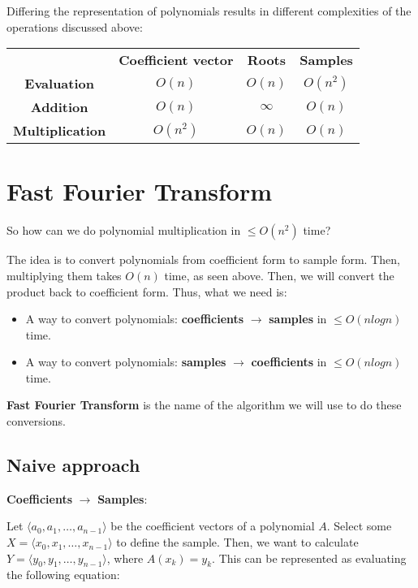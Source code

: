 \documentclass[11pt]{article}
\theoremstyle{plain}
\theoremstyle{definition}
\begin{document}
Differing the representation of polynomials results in different complexities of the operations 
discussed above:

\begin{center}
    \begin{tabular}{ c c c c }
        & \textbf{Coefficient vector} & \textbf{Roots} & \textbf{Samples} \\ 
        \textbf{Evaluation} & $O(n)$ & $O(n)$ & $O(n^2)$\\
        \textbf{Addition} & $O(n)$ & $\infty$ & $O(n)$\\
        \textbf{Multiplication} & $O(n^2)$ & $O(n)$ & $O(n)$\\
    \end{tabular}
\end{center}

\section{Fast Fourier Transform}

So how can we do polynomial multiplication in $\leq O(n^2)$ time?

The idea is to convert polynomials from coefficient form to sample form. Then, multiplying them takes 
$O(n)$ time, as seen above. Then, we will convert the product back to coefficient form. Thus, what
we need is:
\begin{itemize}
    \item A way to convert polynomials: \textbf{coefficients} $\rightarrow$ \textbf{samples} in 
        $\leq O(nlogn)$ time.
    \item A way to convert polynomials: \textbf{samples} $\rightarrow$ \textbf{coefficients} in 
        $\leq O(nlogn)$ time.
\end{itemize}

\textbf{Fast Fourier Transform} is the name of the algorithm we will use to do these conversions.

\subsection{Naive approach}

\textbf{Coefficients} $\rightarrow$ \textbf{Samples}:

Let $\langle a_0, a_1, \ldots, a_{n-1} \rangle$ be the coefficient vectors of a polynomial $A$.
Select some $X = \langle x_0, x_1, \ldots, x_{n-1} \rangle$ to define the sample. Then, we want to calculate
$Y = \langle y_0, y_1, \ldots, y_{n-1} \rangle$, where $A(x_k) = y_k$. This can be represented as 
evaluating the following equation:
\end{document}
